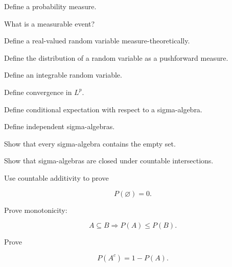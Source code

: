 \begin{exercise}[1]
Define a probability measure.
\end{exercise}

\begin{exercise}[1]
What is a measurable event?
\end{exercise}

\begin{exercise}[1]
Define a real-valued random variable measure-theoretically.
\end{exercise}

\begin{exercise}[1]
Define the distribution of a random variable as a pushforward measure.
\end{exercise}

\begin{exercise}[1]
Define an integrable random variable.
\end{exercise}

\begin{exercise}[1]
Define convergence in \(L^p\).
\end{exercise}

\begin{exercise}[1]
Define conditional expectation with respect to a sigma-algebra.
\end{exercise}

\begin{exercise}[1]
Define independent sigma-algebras.
\end{exercise}

\begin{exercise}[2]
Show that every sigma-algebra contains the empty set.
\end{exercise}

\begin{exercise}[2]
Show that sigma-algebras are closed under countable intersections.
\end{exercise}

\begin{exercise}[2]
Use countable additivity to prove

\[
P(\varnothing)=0.
\]
\end{exercise}

\begin{exercise}[2]
Prove monotonicity:

\[
A\subseteq B
\Longrightarrow
P(A)\leq P(B).
\]
\end{exercise}

\begin{exercise}[2]
Prove

\[
P(A^c)=1-P(A).
\]
\end{exercise}

